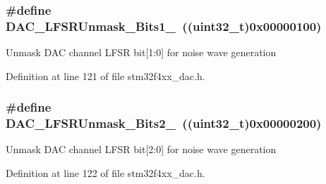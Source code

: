 \hypertarget{group___d_a_c__lfsrunmask__triangleamplitude_ga09f47cfa563252a1add4662284350c07}{
\subsubsection[{D\-A\-C\-\_\-\-L\-F\-S\-R\-Unmask\-\_\-\-Bits1\-\_\-0}]{\setlength{\rightskip}{0pt plus 5cm}\#define D\-A\-C\-\_\-\-L\-F\-S\-R\-Unmask\-\_\-\-Bits1\-\_~((uint32\-\_\-t)0x00000100)}}\label{group___d_a_c__lfsrunmask__triangleamplitude_ga09f47cfa563252a1add4662284350c07}
Unmask D\-A\-C channel L\-F\-S\-R bit\mbox{[}1\-:0\mbox{]} for noise wave generation 

Definition at line 121 of file stm32f4xx\-\_\-dac.\-h.

\hypertarget{group___d_a_c__lfsrunmask__triangleamplitude_ga60b800857b7e33d9c0be2846fc56849f}{
\subsubsection[{D\-A\-C\-\_\-\-L\-F\-S\-R\-Unmask\-\_\-\-Bits2\-\_\-0}]{\setlength{\rightskip}{0pt plus 5cm}\#define D\-A\-C\-\_\-\-L\-F\-S\-R\-Unmask\-\_\-\-Bits2\-\_~((uint32\-\_\-t)0x00000200)}}\label{group___d_a_c__lfsrunmask__triangleamplitude_ga60b800857b7e33d9c0be2846fc56849f}
Unmask D\-A\-C channel L\-F\-S\-R bit\mbox{[}2\-:0\mbox{]} for noise wave generation 

Definition at line 122 of file stm32f4xx\-\_\-dac.\-h.

